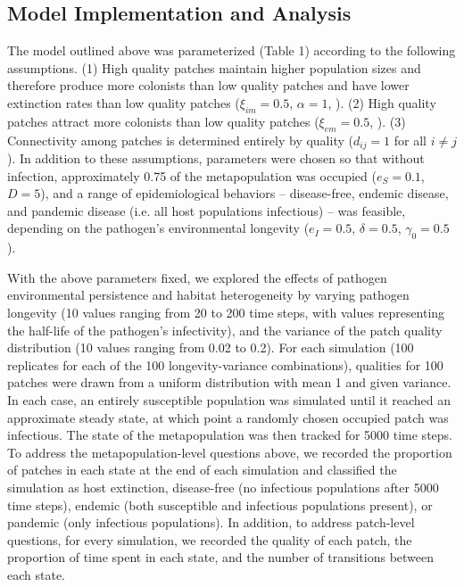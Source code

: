 \documentclass{svjour3}
\begin{document}
\subsection{Model Implementation and Analysis}

The model outlined above was parameterized (Table 1) according to the following assumptions. (1) High quality patches maintain higher population sizes and therefore produce more colonists than low quality patches and have lower extinction rates than low quality patches ($\xi_{im}=0.5$, $\alpha=1$, \cite{Hanski2003}).  (2) High quality patches attract more colonists than low quality patches ($\xi_{em}=0.5$, \cite{Hanski2003}).  (3)  Connectivity among patches is determined entirely by quality ($d_{ij}=1$ for all $i \neq j$).  In addition to these assumptions, parameters were chosen so that without infection, approximately 0.75 of the metapopulation was occupied ($e_S = 0.1$, $D=5$), and a range of epidemiological behaviors -- disease-free, endemic disease, and pandemic disease (i.e. all host populations infectious) -- was feasible, depending on the pathogen's environmental longevity ($e_I = 0.5$, $\delta = 0.5$, $\gamma_0 = 0.5$). 

With the above parameters fixed, we explored the effects of pathogen environmental persistence and habitat heterogeneity by varying pathogen longevity (10 values ranging from 20 to 200 time steps, with values representing the half-life of the pathogen's infectivity), and the variance of the patch quality distribution (10 values ranging from 0.02 to 0.2).  For each simulation (100 replicates for each of the 100 longevity-variance combinations), qualities for 100 patches were drawn from a uniform distribution with mean 1 and given variance. In each case, an entirely susceptible population was simulated until it reached an approximate steady state, at which point a randomly chosen occupied patch was infectious.  The state of the metapopulation was then tracked for 5000 time steps.  To address the metapopulation-level questions above, we recorded the proportion of patches in each state at the end of each simulation and classified the simulation as host extinction, disease-free (no infectious populations after 5000 time steps), endemic (both susceptible and infectious populations present), or pandemic (only infectious populations).  In addition, to address patch-level questions, for every simulation, we recorded the quality of each patch, the proportion of time spent in each state, and the number of transitions between each state.  
\end{document}

